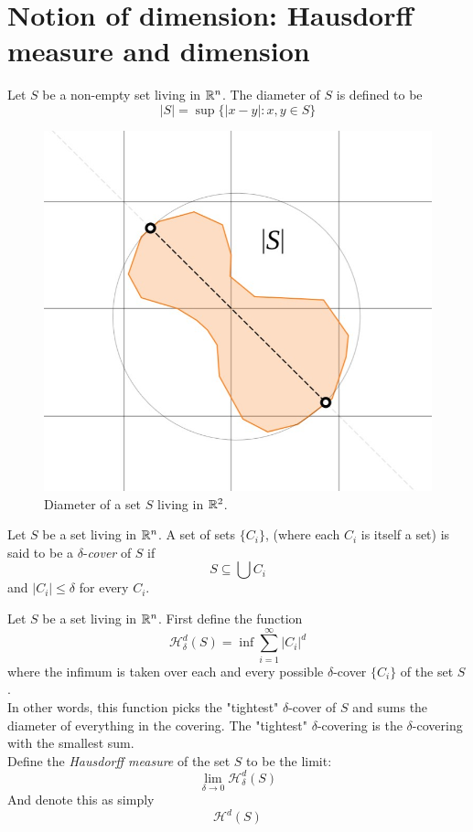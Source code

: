 \documentclass[11pt]{ekblite}
\begin{document}
\section{Notion of dimension: Hausdorff measure and dimension}
\begin{definition}
	Let $S$ be a non-empty set living in $\mathbb{R}^n$. The diameter of $S$ is defined to be 
	\[|S| = \sup \{|x - y| : x,y \in S\}\] 
\end{definition}
\begin{figure}[h]
	\includegraphics[scale=0.25]{img/c14.jpg}
	\caption{Diameter of a set $S$ living in $\mathbb{R}^2$.}
\end{figure}
\begin{definition}
	Let $S$ be a set living in $\mathbb{R}^n$. A set of sets $\{C_i\}$, (where each $C_i$ is itself a set) is said to be a $\delta$-\textit{cover} of $S$ if 
	\[S \subseteq \bigcup C_i\]
	and $|C_i| \le \delta$ for every $C_i$.\cite{falconer1} 
\end{definition}
\begin{definition}
	Let $S$ be a set living in $\mathbb{R}^n$. First define the function
	\[\mathcal{H}_{\delta}^{d}(S) = \inf \sum_{i=1}^{\infty} |C_i|^d\]
	where the infimum is taken over each and every possible $\delta$-cover $\{C_i\}$ of the set $S$.\cite{falconer1}
	\\[0.2in]In other words, this function picks the "tightest" $\delta$-cover of $S$ and sums the diameter of everything in the covering. The "tightest" $\delta$-covering is the $\delta$-covering with the smallest sum.
	\\[0.2in]Define the \textit{Hausdorff measure} of the set $S$ to be the limit:
	\[\lim_{\delta \rightarrow 0} \mathcal{H}_{\delta}^d(S) \]
	And denote this as simply
	\[\mathcal{H}^d(S)\]
\end{definition}
\end{document}
